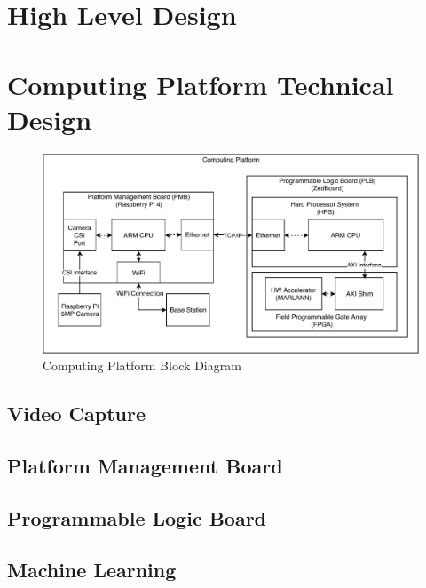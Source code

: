\documentclass[10pt,letterpaper]{article}
\begin{document}
\section{High Level Design}\label{high_level_design}


\section{Computing Platform Technical Design}\label{computing_platform}

\begin{figure}\label{pcdiag}
\centering
\includegraphics[width=16.5cm]{img/pc_diagram.pdf}
\caption{Computing Platform Block Diagram}
\end{figure}

\subsection{Video Capture}\label{video_capture}


\subsection{Platform Management Board}\label{platform_management}


\subsection{Programmable Logic Board}\label{programmable_logic}


\subsection{Machine Learning}\label{machine_learning}

\end{document}
